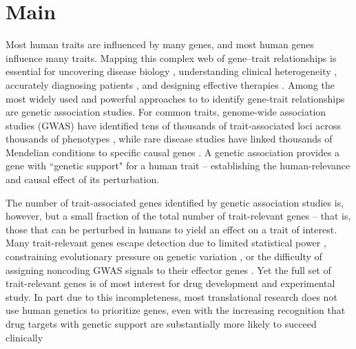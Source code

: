 \section{Main}\label{sec:introduction}

Most human traits are influenced by many genes, and most human genes influence many traits. Mapping this complex web of gene–trait relationships is essential for uncovering disease biology \cite{cohen_sequence_2006}, understanding clinical heterogeneity \cite{udler_type_2018}, accurately diagnosing patients \cite{yang_clinical_2013}, and designing effective therapies \cite{plenge_validating_2013}. Among the most widely used and powerful approaches to to identify gene-trait relationships are genetic association studies. For common traits, genome-wide association studies (GWAS) have identified tens of thousands of trait-associated loci across thousands of phenotypes \cite{abdellaoui_15_2023}, while rare disease studies have linked thousands of Mendelian conditions to specific causal genes \cite{chung_meta-analysis_2023}. A genetic association provides a gene with ``genetic support" for a human trait -- establishing the human-relevance and causal effect of its perturbation.

The number of trait-associated genes identified by genetic association studies is, however, but a small fraction of the total number of trait-relevant genes -- that is, those that can be perturbed in humans to yield an effect on a trait of interest\cite{finan_druggable_2017}. Many trait-relevant genes escape detection due to limited statistical power \cite{wang_statistical_2019}, constraining evolutionary pressure on genetic variation \cite{gazal_linkage_2017}, or the difficulty of assigning noncoding GWAS signals to their effector genes \cite{schipper_demystifying_2022,costanzo_realizing_2025}. Yet the full set of trait-relevant genes is of most interest for drug development and experimental study\cite{jhamb_pathway_2019,macnamara_network_2020}. In part due to this incompleteness, most translational research does not use human genetics to prioritize genes\cite{wehling_assessing_2009,dornbos_evaluating_2022}, even with the  increasing recognition that drug targets with genetic support are substantially more likely to succeed clinically\cite{plenge_validating_2013,minikel_refining_2024} 


